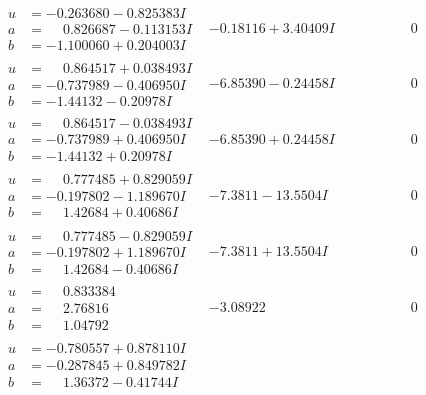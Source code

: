 \documentclass[1p]{elsarticle_modified}
\theoremstyle{definition}
\begin{document}
$$\begin{array}{c|c|c}
\begin{aligned}
u &= -0.263680 - 0.825383 I \\
a &= \phantom{-}0.826687 - 0.113153 I \\
b &= -1.100060 + 0.204003 I\end{aligned}
 & -0.18116 + 3.40409 I & \phantom{-0.000000 } 0 \\ \hline\begin{aligned}
u &= \phantom{-}0.864517 + 0.038493 I \\
a &= -0.737989 - 0.406950 I \\
b &= -1.44132 - 0.20978 I\end{aligned}
 & -6.85390 - 0.24458 I & \phantom{-0.000000 } 0 \\ \hline\begin{aligned}
u &= \phantom{-}0.864517 - 0.038493 I \\
a &= -0.737989 + 0.406950 I \\
b &= -1.44132 + 0.20978 I\end{aligned}
 & -6.85390 + 0.24458 I & \phantom{-0.000000 } 0 \\ \hline\begin{aligned}
u &= \phantom{-}0.777485 + 0.829059 I \\
a &= -0.197802 - 1.189670 I \\
b &= \phantom{-}1.42684 + 0.40686 I\end{aligned}
 & -7.3811 - 13.5504 I & \phantom{-0.000000 } 0 \\ \hline\begin{aligned}
u &= \phantom{-}0.777485 - 0.829059 I \\
a &= -0.197802 + 1.189670 I \\
b &= \phantom{-}1.42684 - 0.40686 I\end{aligned}
 & -7.3811 + 13.5504 I & \phantom{-0.000000 } 0 \\ \hline\begin{aligned}
u &= \phantom{-}0.833384\phantom{ +0.000000I} \\
a &= \phantom{-}2.76816\phantom{ +0.000000I} \\
b &= \phantom{-}1.04792\phantom{ +0.000000I}\end{aligned}
 & -3.08922\phantom{ +0.000000I} & \phantom{-0.000000 } 0 \\ \hline\begin{aligned}
u &= -0.780557 + 0.878110 I \\
a &= -0.287845 + 0.849782 I \\
b &= \phantom{-}1.36372 - 0.41744 I\end{aligned}

\end{array}$$
\end{document}
